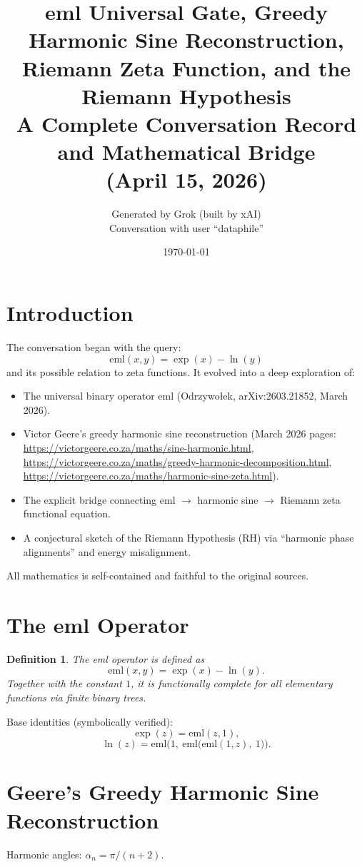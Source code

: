\documentclass[11pt,a4paper]{article}
\title{
  \textbf{eml Universal Gate, Greedy Harmonic Sine Reconstruction,\\ 
  Riemann Zeta Function, and the Riemann Hypothesis}\\
  \large A Complete Conversation Record and Mathematical Bridge\\
  (April 15, 2026)
}
\author{
  Generated by Grok (built by xAI)\\
  Conversation with user ``dataphile''
}
\date{\today}
\newtheorem{definition}{Definition}
\begin{document}
\maketitle

\tableofcontents

\section{Introduction}
The conversation began with the query:
\[
\text{eml}(x,y) = \exp(x) - \ln(y)
\]
and its possible relation to zeta functions. It evolved into a deep exploration of:
\begin{itemize}
\item The universal binary operator eml (Odrzywołek, arXiv:2603.21852, March 2026).
\item Victor Geere’s greedy harmonic sine reconstruction (March 2026 pages: \url{https://victorgeere.co.za/maths/sine-harmonic.html}, \url{https://victorgeere.co.za/maths/greedy-harmonic-decomposition.html}, \url{https://victorgeere.co.za/maths/harmonic-sine-zeta.html}).
\item The explicit bridge connecting eml $\to$ harmonic sine $\to$ Riemann zeta functional equation.
\item A conjectural sketch of the Riemann Hypothesis (RH) via ``harmonic phase alignments'' and energy misalignment.
\end{itemize}

All mathematics is self-contained and faithful to the original sources.

\section{The eml Operator}
\begin{definition}
The eml operator is defined as
\[
\mathrm{eml}(x,y) = \exp(x) - \ln(y).
\]
Together with the constant $1$, it is functionally complete for all elementary functions via finite binary trees.
\end{definition}

Base identities (symbolically verified):
\[
\exp(z) = \mathrm{eml}(z,1),
\]
\[
\ln(z) = \mathrm{eml}\bigl(1,\ \mathrm{eml}\bigl(\mathrm{eml}(1,z),\ 1\bigr)\bigr).
\]

\section{Geere’s Greedy Harmonic Sine Reconstruction}
Harmonic angles: \(\alpha_n = \pi/(n+2)\).
\end{document}
